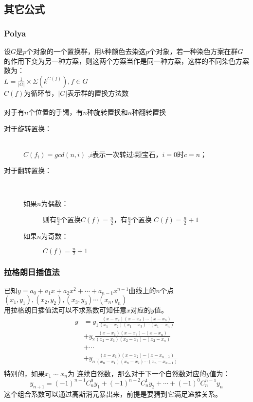 \subsection{其它公式}
    \subsubsection{Polya}
	设$G$是$p$个对象的一个置换群，用$k$种颜色去染这$p$个对象，若一种染色方案在群$G$的作用下变为另一种方案，则这两个方案当作是同一种方案，这样的不同染色方案数为：\\
	$L=\frac{1}{\left |G  \right |}\times \Sigma(k^{C(f)}), f\in G$\\
	$C(f)$为循环节，$\left |G  \right |$表示群的置换方法数\\
	\\
	对于有$n$个位置的手镯，有$n$种旋转置换和$n$种翻转置换
	\begin{description}
	    \item[对于旋转置换：] ~\\
		$C(f_i)=gcd(n,i)$ ,$i$表示一次转过i颗宝石，$i=0$时$c=n$；\\
	    \item[对于翻转置换：] ~\\
		\begin{description}
		    \item[如果$n$为偶数：] 则有$\frac{n}{2}$个置换$C(f)=\frac{n}{2}$，有$\frac{n}{2}$个置换 $C(f)=\frac{n}{2}+1$\\
		    \item[如果$n$为奇数：] $C(f)=\frac{n}{2}+1$\\
		\end{description}
	\end{description}

    \subsubsection{拉格朗日插值法}
	已知$y=a_0+a_1x+a_2x^2+\cdots +a_{n-1}x^{n-1}$曲线上的$n$个点$(x_1,y_1),(x_2,y_2),(x_3,y_3)\cdots (x_n,y_n)$\\
	用拉格朗日插值法可以不求系数可知任意$x$对应的$y$值。\\
	\[ \begin{split}
	y &= y_1\frac{(x-x_2)(x-x_3)\cdots (x-x_n)}{(x_1-x_2)(x_1-x_3)\cdots (x_1-x_n)}\\
	&+ y_2\frac{(x-x_1)(x-x_3)\cdots (x-x_n)}{(x_2-x_1)(x_2-x_3)\cdots (x_2-x_n)}\\
	&+ \cdots \\
	&+ y_n\frac{(x-x_1)(x-x_2)\cdots (x-x_{n-1})}{(x_n-x_1)(x_n-x_2)\cdots (x_n-x_{n-1})}\\
	\end{split}\]
	特别的，如果$x_1\sim x_n$为 连续自然数，那么对于下一个自然数对应的$y$值为：\\
	\[y_{n+1}=(-1)^{n-1}C_n^0y_1+(-1)^{n-2}C_n^1y_2+\cdots +(-1)^0C_n^{n-1}y_n\]
	这个组合系数可以通过高斯消元暴出来，前提是要猜到它满足递推关系。\\
    

